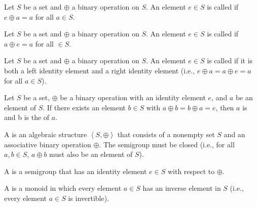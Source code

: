 \begin{defi} Let $S$ be a set and $\oplus$ a binary operation on $S$. An element $e\in S$ is called  if $e\oplus a = a$ for all $a\in S$.\cite{Oppliger:2011:CC:2049860}
\end{defi}

\begin{defi} Let $S$ be a set and $\oplus$ a binary operation on $S$. An element $e\in S$ is called  if $a\oplus e = a$ for all $\in S$.\cite{Oppliger:2011:CC:2049860}
\end{defi}

\begin{defi} Let $S$ be a set and $\oplus$ a binary operation on $S$. An element $e\in S$ is called  if it is both a left identity element and a right identity element (i.e., $e\oplus a = a\oplus e = a$ for all $a\in S$).
\cite{Oppliger:2011:CC:2049860}
\end{defi}

\begin{defi} Let $S$ be a set, $\oplus$ be a binary operation with an identity element $e$, and $a$ be an element of $S$. If there exists an element $b\in S$ with $a\oplus b = b\oplus a = e$, then $a$ is  and b is the  of $a$.
\cite{Oppliger:2011:CC:2049860}
\end{defi}

\begin{defi}[Semigroup]
A  is an algebraic structure $\left\langle S,\oplus\right\rangle$ that consists of a nonempty set $S$ and an associative binary operation $\oplus$. The semigroup must be closed (i.e., for all $a,b\in S$, $a\oplus b$ must also be an element of $S$).
\cite{Oppliger:2011:CC:2049860}
\end{defi}

\begin{defi}[Monoid]
A  is a semigroup \soplus that has an identity element $e\in S$ with respect to $\oplus$.
\cite{Oppliger:2011:CC:2049860}
\end{defi}

\begin{defi}[Group]
A  is a monoid \soplus in which every element $a\in S$ has an inverse element in $S$ (i.e., every element $a\in S$ is invertible).
\cite{Oppliger:2011:CC:2049860}
\end{defi}


